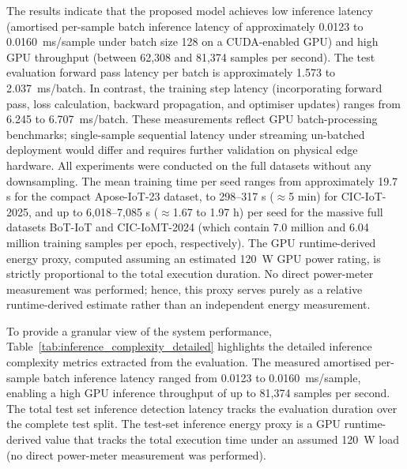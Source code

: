 \documentclass[a4paper,fleqn]{cas-sc}
\begin{document}
The results indicate that the proposed model achieves low inference latency (amortised per-sample batch inference latency of approximately 0.0123 to 0.0160~ms/sample under batch size 128 on a CUDA-enabled GPU) and high GPU throughput (between 62,308 and 81,374 samples per second). The test evaluation forward pass latency per batch is approximately 1.573 to 2.037~ms/batch. In contrast, the training step latency (incorporating forward pass, loss calculation, backward propagation, and optimiser updates) ranges from 6.245 to 6.707~ms/batch. These measurements reflect GPU batch-processing benchmarks; single-sample sequential latency under streaming un-batched deployment would differ and requires further validation on physical edge hardware. All experiments were conducted on the full datasets without any downsampling. The mean training time per seed ranges from approximately 19.7 s for the compact Apose-IoT-23 dataset, to 298–317 s ($\approx$5 min) for CIC-IoT-2025, and up to 6,018–7,085 s ($\approx$1.67 to 1.97 h) per seed for the massive full datasets BoT-IoT and CIC-IoMT-2024 (which contain 7.0 million and 6.04 million training samples per epoch, respectively). The GPU runtime-derived energy proxy, computed assuming an estimated 120~W GPU power rating, is strictly proportional to the total execution duration. No direct power-meter measurement was performed; hence, this proxy serves purely as a relative runtime-derived estimate rather than an independent energy measurement.

To provide a granular view of the system performance, Table~\ref{tab:inference_complexity_detailed} highlights the detailed inference complexity metrics extracted from the evaluation. The measured amortised per-sample batch inference latency ranged from 0.0123 to 0.0160~ms/sample, enabling a high GPU inference throughput of up to 81,374 samples per second. The total test set inference detection latency tracks the evaluation duration over the complete test split. The test-set inference energy proxy is a GPU runtime-derived value that tracks the total execution time under an assumed 120~W load (no direct power-meter measurement was performed).
\end{document}

